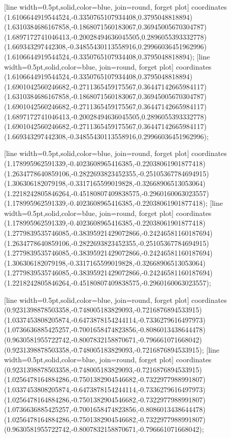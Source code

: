 [line width=0.5pt,solid,color=blue, join=round, forget plot] coordinates {(1.6106644919544524,-0.3350765107934408,0.3795048818894) (1.6310384686167858,-0.1868071560183067,0.36945005670304787) (1.6897172741046413,-0.20028494636045505,0.2896055393332778) (1.669343297442308,-0.34855430113558916,0.29966036451962996) (1.6106644919544524,-0.3350765107934408,0.3795048818894)};
[line width=0.5pt,solid,color=blue, join=round, forget plot] coordinates {(1.6106644919544524,-0.3350765107934408,0.3795048818894) (1.6901042560246682,-0.2711365459175567,0.36447142665984117) (1.6310384686167858,-0.1868071560183067,0.36945005670304787) (1.6901042560246682,-0.2711365459175567,0.36447142665984117) (1.6897172741046413,-0.20028494636045505,0.2896055393332778) (1.6901042560246682,-0.2711365459175567,0.36447142665984117) (1.669343297442308,-0.34855430113558916,0.29966036451962996)};

[line width=0.5pt,solid,color=blue, join=round, forget plot] coordinates {(1.178995962591339,-0.4023608965416385,-0.22038061901877418) (1.2634778640859106,-0.2822693823452355,-0.25105367784694915) (1.306306182079198,-0.3317165599019828,-0.32668906513053064) (1.2218242805846264,-0.45180807409838575,-0.2960160063023557) (1.178995962591339,-0.4023608965416385,-0.22038061901877418)};
[line width=0.5pt,solid,color=blue, join=round, forget plot] coordinates {(1.178995962591339,-0.4023608965416385,-0.22038061901877418) (1.2779839535746085,-0.38395921429072866,-0.24246581160187694) (1.2634778640859106,-0.2822693823452355,-0.25105367784694915) (1.2779839535746085,-0.38395921429072866,-0.24246581160187694) (1.306306182079198,-0.3317165599019828,-0.32668906513053064) (1.2779839535746085,-0.38395921429072866,-0.24246581160187694) (1.2218242805846264,-0.45180807409838575,-0.2960160063023557)};

[line width=0.5pt,solid,color=blue, join=round, forget plot] coordinates {(0.9231398878503358,-0.748005183829093,-0.7216876894533915) (1.0337453808205874,-0.6473878154244114,-0.7336279616497973) (1.0736636885425257,-0.7001658474823856,-0.8086013438644478) (0.9630581955722742,-0.8007832158870671,-0.796661071668042) (0.9231398878503358,-0.748005183829093,-0.7216876894533915)};
[line width=0.5pt,solid,color=blue, join=round, forget plot] coordinates {(0.9231398878503358,-0.748005183829093,-0.7216876894533915) (1.0256478164884286,-0.7501382904546682,-0.7322977988991807) (1.0337453808205874,-0.6473878154244114,-0.7336279616497973) (1.0256478164884286,-0.7501382904546682,-0.7322977988991807) (1.0736636885425257,-0.7001658474823856,-0.8086013438644478) (1.0256478164884286,-0.7501382904546682,-0.7322977988991807) (0.9630581955722742,-0.8007832158870671,-0.796661071668042)};

